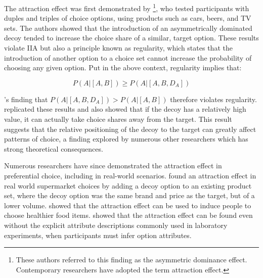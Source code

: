 The attraction effect was first demonstrated by \textcite{huberAddingAsymmetricallyDominated1982d}\footnote{These authors referred to this finding as the asymmetric dominance effect. Contemporary researchers have adopted the term attraction effect.}, who tested participants with duples and triples of choice options, using products such as cars, beers, and TV sets. The authors showed that the introduction of an asymmetrically dominated decoy tended to increase the choice share of a similar, target option. These results violate IIA but also a principle known as regularity, which states that the introduction of another option to a choice set cannot increase the probability of choosing any given option. Put in the above context, regularity implies that:

\begin{equation}
  P(A|[A,B])\geq P(A|[A,B,D_{A}])
  \label{eqn:reg_att}
\end{equation}

\textcite{huberAddingAsymmetricallyDominated1982d}'s finding that $P(A|[A,B,D_{A}]) > P(A|[A,B])$ therefore violates regularity. \textcite{huber1983market} replicated these results and also showed that if the decoy has a relatively high value, it can actually take choice shares away from the target. This result suggests that the relative positioning of the decoy to the target can greatly affect patterns of choice, a finding explored by numerous other researchers which has strong theoretical consequences.

Numerous researchers have since demonstrated the attraction effect in preferential choice, including in real-world scenarios. \textcite{doyleRobustnessAsymmetricallyDominated1999} found an attraction effect in real world supermarket choices by adding a decoy option to an existing product set, where the decoy option was the same brand and price as the target, but of a lower volume. \textcite{van2021attract} showed that the attraction effect can be used to induce people to choose healthier food items. \textcite{slaughterDecoyEffectsAttributelevel1999b} showed that the attraction effect can be found even without the explicit attribute descriptions commonly used in laboratory experiments, when participants must infer option attributes. 


